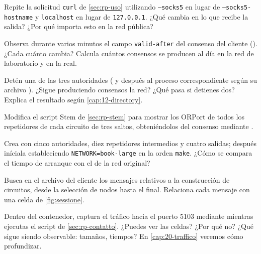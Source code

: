 \begin{esercizio}[1]\label{es:19-socks}
Repite la solicitud \texttt{curl} de \cref{sec:rp-uso} utilizando \texttt{--socks5} en lugar de \texttt{--socks5-hostname} y \texttt{localhost} en lugar de \texttt{127.0.0.1}. ¿Qué cambia en lo que recibe la salida? ¿Por qué importa esto en la red pública?
\end{esercizio}

\begin{esercizio}[2]\label{es:19-consenso}
Observa durante varios minutos el campo \texttt{valid-after} del consenso del cliente (). ¿Cada cuánto cambia? Calcula cuántos consensos se producen al día en la red de laboratorio y en la real.
\end{esercizio}

\begin{esercizio}[2]\label{es:19-autorita}
Detén una de las tres autoridades ( y después  al proceso correspondiente según su archivo ). ¿Sigue produciendo consensos la red? ¿Qué pasa si detienes dos? Explica el resultado según \cref{cap:12-directory}.
\end{esercizio}

\begin{esercizio}[2]\label{es:19-stem}
Modifica el script Stem de \cref{sec:rp-stem} para mostrar los ORPort de todos los repetidores de cada circuito de tres saltos, obteniéndolos del consenso mediante .
\end{esercizio}

\begin{esercizio}[2]\label{es:19-rete}
Crea  con cinco autoridades, diez repetidores intermedios y cuatro salidas; después iníciala estableciendo \texttt{NETWORK=book-large} en la orden \texttt{make}. ¿Cómo se compara el tiempo de arranque con el de la red original?
\end{esercizio}

\begin{esercizio}[3]\label{es:19-log}
Busca en el archivo  del cliente los mensajes relativos a la construcción de circuitos, desde la selección de nodos hasta el final. Relaciona cada mensaje con una celda de \cref{fig:sessione}.
\end{esercizio}

\begin{esercizio}[3]\label{es:19-cattura}
Dentro del contenedor, captura el tráfico hacia el puerto 5103 mediante  mientras ejecutas el script de \cref{sec:rp-contatto}. ¿Puedes ver las celdas? ¿Por qué no? ¿Qué sigue siendo observable: tamaños, tiempos? En \cref{cap:20-traffico} veremos cómo profundizar.
\end{esercizio}

